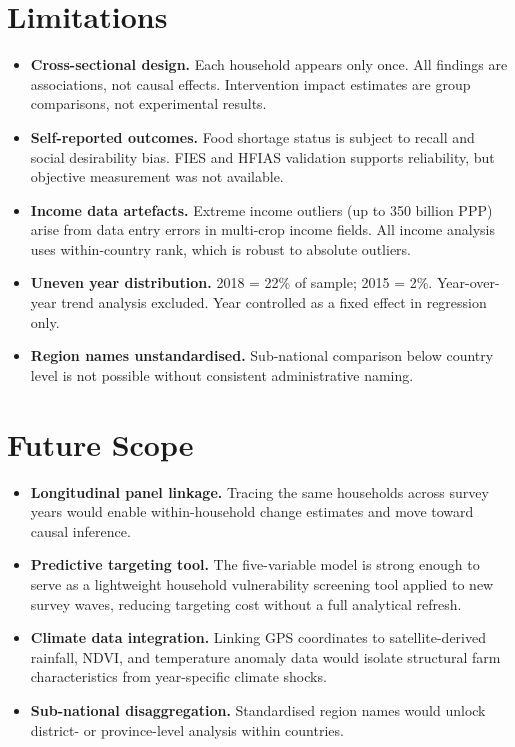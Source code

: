 \documentclass[11pt,a4paper]{article}
\begin{document}
\section{Limitations}

\begin{itemize}
  \item \textbf{Cross-sectional design.} Each household appears only once. All findings are associations, not causal effects. Intervention impact estimates are group comparisons, not experimental results.
  \item \textbf{Self-reported outcomes.} Food shortage status is subject to recall and social desirability bias. FIES and HFIAS validation supports reliability, but objective measurement was not available.
  \item \textbf{Income data artefacts.} Extreme income outliers (up to 350 billion PPP) arise from data entry errors in multi-crop income fields. All income analysis uses within-country rank, which is robust to absolute outliers.
  \item \textbf{Uneven year distribution.} 2018 = 22\% of sample; 2015 = 2\%. Year-over-year trend analysis excluded. Year controlled as a fixed effect in regression only.
  \item \textbf{Region names unstandardised.} Sub-national comparison below country level is not possible without consistent administrative naming.
\end{itemize}

\vspace{10pt}

\section{Future Scope}

\begin{itemize}
  \item \textbf{Longitudinal panel linkage.} Tracing the same households across survey years would enable within-household change estimates and move toward causal inference.
  \item \textbf{Predictive targeting tool.} The five-variable model is strong enough to serve as a lightweight household vulnerability screening tool applied to new survey waves, reducing targeting cost without a full analytical refresh.
  \item \textbf{Climate data integration.} Linking GPS coordinates to satellite-derived rainfall, NDVI, and temperature anomaly data would isolate structural farm characteristics from year-specific climate shocks.
  \item \textbf{Sub-national disaggregation.} Standardised region names would unlock district- or province-level analysis within countries.
\end{itemize}
\end{document}
